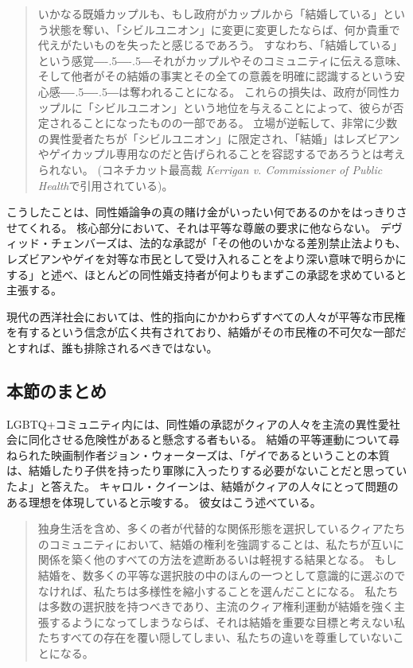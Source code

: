 \documentclass[paper=a4,book,openany]{jlreq}
\newcommand{\ig}[1]{}           %
\def\DDASH{―\kern-.5\zw―\kern-.5\zw―} %
\begin{document}
\begin{quote}
いかなる既婚カップルも、もし政府がカップルから「結婚している」という状態を奪い、「シビルユニオン」に変更に変更したならば、何か貴重で代えがたいものを失ったと感じるであろう。
すなわち、「結婚している」という感覚{\DDASH}それがカップルやそのコミュニティに伝える意味、そして他者がその結婚の事実とその全ての意義を明確に認識するという安心感{\DDASH}は奪われることになる。
これらの損失は、政府が同性カップルに「シビルユニオン」という地位を与えることによって、彼らが否定されることになったものの一部である。
立場が逆転して、非常に少数の異性愛者たちが「シビルユニオン」に限定され、「結婚」はレズビアンやゲイカップル専用なのだと告げられることを容認するであろうとは考えられない。
(コネチカット最高裁 \emph{Kerrigan v. Commissioner of Public Health}で引用されている)。
\end{quote}

こうしたことは、同性婚論争の真の賭け金がいったい何であるのかをはっきりさせてくれる。
核心部分において、それは平等な尊厳の要求に他ならない。
デヴィッド・チェンバーズは、法的な承認が「その他のいかなる差別禁止法よりも、レズビアンやゲイを対等な市民として受け入れることをより深い意味で明らかにする」と述べ、ほとんどの同性婚支持者が何よりもまずこの承認を求めていると主張する\citep[p.450]{chambers96:_what_if}。
\ig{David L. Chambers}
現代の西洋社会においては、性的指向にかかわらずすべての人々が平等な市民権を有するという信念が広く共有されており、結婚がその市民権の不可欠な一部だとすれば、誰も排除されるべきではない。

\subsection{本節のまとめ}

LGBTQ+コミュニティ内には、同性婚の承認がクィアの人々を主流の異性愛社会に同化させる危険性があると懸念する者もいる。
結婚の平等運動について尋ねられた映画制作者ジョン・ウォーターズは、「ゲイであるということの本質は、結婚したり子供を持ったり軍隊に入ったりする必要がないことだと思っていたよ」と答えた\citep{haag13:_unqueer_world}。
キャロル・クイーンは、結婚がクィアの人々にとって問題のある理想を体現していると示唆する。
彼女はこう述べている。

\begin{quote}
独身生活を含め、多くの者が代替的な関係形態を選択しているクィアたちのコミュニティにおいて、結婚の権利を強調することは、私たちが互いに関係を築く他のすべての方法を遮断あるいは軽視する結果となる。
もし結婚を、数多くの平等な選択肢の中のほんの一つとして意識的に選ぶのでなければ、私たちは多様性を縮小することを選んだことになる。
私たちは多数の選択肢を持つべきであり、主流のクィア権利運動が結婚を強く主張するようになってしまうならば、それは結婚を重要な目標と考えない私たちすべての存在を覆い隠してしまい、私たちの違いを尊重していないことになる。
\citep[p.111]{queen04:_never_brides_never_bride}

\end{quote}
\end{document}
